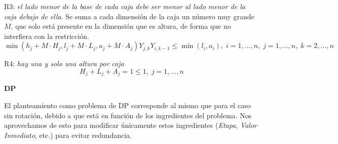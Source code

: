 \documentclass[letterpaper,10pt]{article}
\begin{document}
R3: \textit{el lado menor de la base de cada caja debe ser menor al lado menor de la caja debajo de ella}.  Se suma a cada dimensión de la caja un número muy grande $M$, que solo está presente en la dimensión que es altura, de forma que no interfiera con la restricción.
$$\min(h_j + M\cdot H_j, l_j + M\cdot L_j, a_j + M\cdot A_j)Y_{j,k}Y_{i,k-1} \leq \min(l_i, a_i), \; i = 1, \ldots, n, \; j = 1, \ldots, n, \; k = 2, \ldots, n$$

R4: \textit{hay una y solo una altura por caja}
$$H_j + L_j + A_j = 1 \leq 1, \; j = 1, \ldots, n$$

\textbf{DP}

El planteamiento como problema de DP corresponde al mismo que para el caso sin rotación, debido a que está en función de los ingredientes del problema. Nos aprovechamos de esto para modificar únicamente estos ingredientes (\textit{Etapa}, \textit{Valor Inmediato}, etc.) para evitar redundancia.
\end{document}
